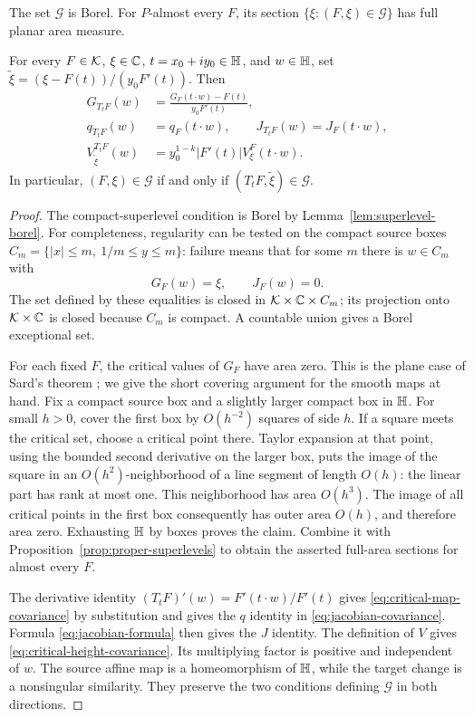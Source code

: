 \begin{lemma}
\label{lem:good-pairs}
The set $\mathcal G$ is Borel.  For $P$-almost every $F$, its section
$\{\xi:(F,\xi)\in\mathcal G\}$ has full planar area measure.

For every $F\in\mathcal K$, $\xi\in\mathbb C$, $t=x_0+iy_0\in\mathbb H$, and $w\in\mathbb H$, set
$\widetilde\xi=(\xi-F(t))/(y_0F'(t))$.  Then
\begin{align}
 G_{T_tF}(w)&=\frac{G_F(t\cdot w)-F(t)}{y_0F'(t)},
 \label{eq:critical-map-covariance}\\
 q_{T_tF}(w)&=q_F(t\cdot w),\qquad J_{T_tF}(w)=J_F(t\cdot w),
 \label{eq:jacobian-covariance}\\
 V^{T_tF}_{\widetilde\xi}(w)
 &=y_0^{1-k}|F'(t)|V^F_\xi(t\cdot w).
 \label{eq:critical-height-covariance}
\end{align}
In particular, $(F,\xi)\in\mathcal G$ if and only if
$(T_tF,\widetilde\xi)\in\mathcal G$.
\end{lemma}

\begin{proof}
The compact-superlevel condition is Borel by
Lemma~\ref{lem:superlevel-borel}.  For completeness, regularity can be tested
on the compact source boxes
$C_m=\{|x|\le m,\ 1/m\le y\le m\}$: failure means that for some $m$
there is $w\in C_m$ with
\[
 G_F(w)=\xi,\qquad J_F(w)=0.
\]
The set defined by these equalities is closed in
$\mathcal K\times\mathbb C\times C_m$; its projection onto $\mathcal K\times\mathbb C$ is closed
because $C_m$ is compact.  A countable union gives a Borel exceptional set.

For each fixed $F$, the critical values of $G_F$ have area zero. This is
the plane case of Sard's theorem \cite[Theorem~4.1]{Sard1942}; we give
the short covering argument for the smooth maps at hand.  Fix a compact source box and a slightly
larger compact box in $\mathbb H$.  For small $h>0$, cover the first box by
$O(h^{-2})$ squares of side $h$.  If a square meets the critical set, choose
a critical point there.  Taylor expansion at that point, using the bounded
second derivative on the larger box, puts the image of the square in an
$O(h^2)$-neighborhood of a line segment of length $O(h)$: the linear part
has rank at most one.  This neighborhood has area $O(h^3)$.
The image of all critical points in the first box consequently has outer
area $O(h)$, and therefore area zero.  Exhausting $\mathbb H$ by boxes proves the
claim.  Combine it with Proposition~\ref{prop:proper-superlevels} to obtain
the asserted full-area sections for almost every $F$.

The derivative identity
$(T_tF)'(w)=F'(t\cdot w)/F'(t)$ gives
\eqref{eq:critical-map-covariance} by substitution and gives the $q$
identity in \eqref{eq:jacobian-covariance}.  Formula
\eqref{eq:jacobian-formula} then gives the $J$ identity.
The definition of $V$ gives \eqref{eq:critical-height-covariance}.
Its multiplying factor is positive and independent of $w$.
The source affine map is a homeomorphism of $\mathbb H$, while the target change
is a nonsingular similarity.  They preserve the two conditions defining
$\mathcal G$ in both directions.
\end{proof}

